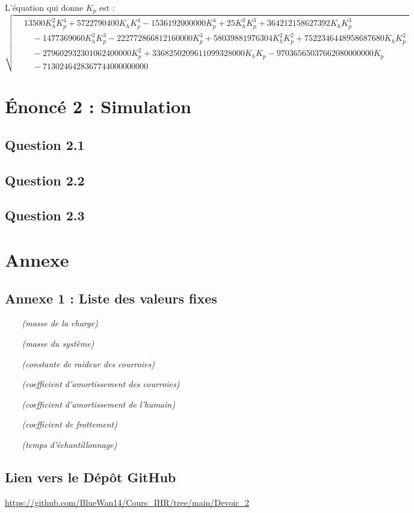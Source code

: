 \documentclass[a4paper,11pt]{article}
\begin{document}
L'équation qui donne $K_p$ est :
\[
\sqrt{
\begin{aligned}
& 13500 K_h^2 K_p^4 + 5722790400 K_h K_p^4 - 1536192000000 K_p^4 + 25 K_h^3 K_p^3 + 364212158627392 K_h K_p^3 \\
& \quad - 1477369060 K_h^2 K_p^3 - 222772866812160000 K_p^3 + 58039881976304 K_h^2 K_p^2 + 7522346448958687680 K_h K_p^2 \\
& \quad - 279602932301062400000 K_p^2 + 3368250209611099328000 K_h K_p - 97036565037662080000000 K_p \\
& \quad - 7130246428367744000000000
\end{aligned}
}
\]



\newpage
\section{Énoncé 2 : Simulation}
\subsection{Question 2.1}

\subsection{Question 2.2}

\subsection{Question 2.3}



\newpage
\section{Annexe}
\subsection{Annexe 1 : Liste des valeurs fixes}
\begin{itemize}
    \item[$$]  \textit{(masse de la charge)}
    \item[$$]  \textit{(masse du système)}
    \item[$$]  \textit{(constante de raideur des courroies)}
    \item[$$]  \textit{(coefficient d'amortissement des courroies)}
    \item[$$]  \textit{(coefficient d'amortissement de l'humain)}
    \item[$$]  \textit{(coefficient de frottement)}
    \item[$$]  \textit{(temps d'échantillonnage)}
\end{itemize}


\subsection{Lien vers le Dépôt GitHub}
\url{https://github.com/BlueWan14/Cours_IHR/tree/main/Devoir_2}
\end{document}
